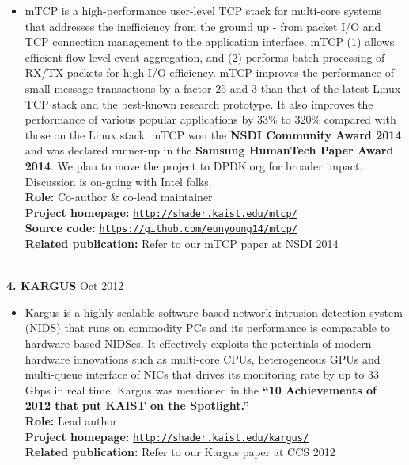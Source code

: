 \documentclass[10pt]{article}
\newenvironment{outerlist}[1][\enskip\textbullet]%
        {\begin{itemize}[#1]}{\end{itemize}%
         \vspace{-.6\baselineskip}}
\begin{document}
\begin{outerlist}
\item[] {mTCP is a high-performance user-level TCP stack for multi-core systems that addresses the inefficiency from the ground up - from packet I/O and TCP connection management to the application interface. mTCP (1) allows efficient flow-level event aggregation, and (2) performs batch processing of RX/TX packets for high I/O efficiency. mTCP improves the performance of small message transactions by a factor 25 and 3 than that of the latest Linux TCP stack and the best-known research prototype. It also improves the performance of various popular applications by 33\% to 320\% compared with those on the Linux stack. mTCP won the {\bf NSDI Community Award 2014} and was declared runner-up in the {\bf Samsung HumanTech Paper Award 2014}. We plan to move the project to DPDK.org for broader impact. Discussion is on-going with Intel folks.}\\
{\bf Role:} Co-author \& co-lead maintainer \\
{\bf Project homepage:} \href{http://shader.kaist.edu/mtcp/}{\texttt{http://shader.kaist.edu/mtcp/}} \\
{\bf Source code:} \href{https://github.com/eunyoung14/mtcp/}{\texttt{https://github.com/eunyoung14/mtcp/}} \\
{\bf Related publication:} Refer to our mTCP paper at NSDI 2014
\end{outerlist}
\ \\
{\textbf{4. K{\footnotesize ARGUS}}}
        \hfill {Oct 2012}
\begin{outerlist}
\item[] {Kargus is a highly-scalable software-based network intrusion detection system (NIDS) that runs on commodity PCs and its performance is comparable to hardware-based NIDSes. It effectively exploits the potentials of modern hardware innovations such as multi-core CPUs, heterogeneous GPUs and multi-queue interface of NICs that drives its monitoring rate by up to 33 Gbps in real time. Kargus was mentioned in the {\bf ``10 Achievements of 2012 that put KAIST on the Spotlight.''}}\\
{\bf Role:} Lead author \\
{\bf Project homepage:} \href{http://shader.kaist.edu/kargus/}{\texttt{http://shader.kaist.edu/kargus/}} \\
{\bf Related publication:} Refer to our Kargus paper at CCS 2012
\end{outerlist}
\ \\
\end{document}
